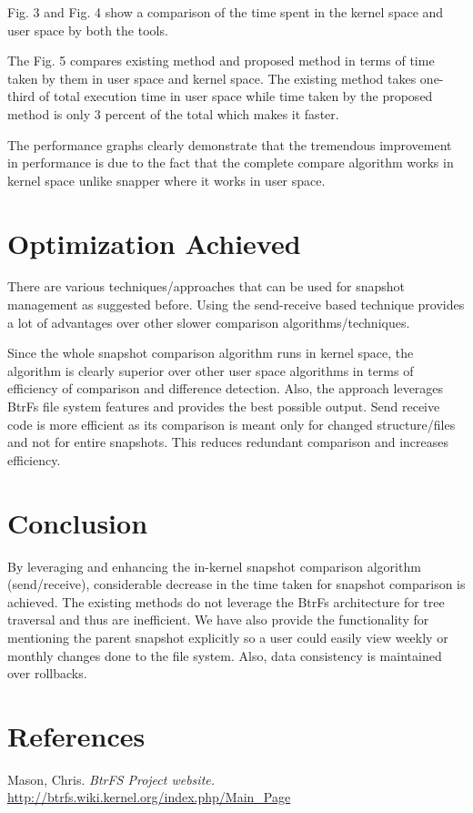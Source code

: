 \documentclass[final]{ols}
\begin{document}
Fig. 3 and Fig. 4 show a comparison of the time spent in the kernel space and user space by both the tools. 

The Fig. 5 compares existing method and proposed method in terms of time taken by them in user space and kernel space.  The existing method takes one-third of total execution time in user space while time taken by the proposed method is only 3 percent of the total which makes it faster. 

The performance graphs clearly demonstrate that the tremendous improvement in performance is due to the fact that the complete compare algorithm works in kernel space unlike snapper where it works in user space.

\section{Optimization Achieved}\label{lockhart-OptimizationAchieved}
There are various techniques/approaches that can be used for snapshot management as suggested before. Using the send-receive based technique provides a lot of advantages over other slower comparison algorithms/techniques.

Since the whole snapshot comparison algorithm runs in kernel space, the algorithm is clearly superior over other user space algorithms in terms of efficiency of comparison and difference detection. Also, the approach leverages BtrFs file system features and provides the best possible output. Send receive code is more efficient as its comparison is meant only for changed structure/files and not for entire snapshots. This reduces redundant comparison and increases efficiency.

\section{Conclusion}\label{lockhart-Conclusion}
By leveraging and enhancing the in-kernel snapshot comparison algorithm (send/receive), considerable decrease in the time taken for snapshot comparison is achieved. The existing methods do not leverage the BtrFs architecture for tree traversal and thus are inefficient. We  have also provide the functionality for mentioning the parent snapshot explicitly so a user could easily view weekly or monthly changes done to the file system. Also, data consistency is maintained over rollbacks.

\section{References}\label{lockhart-References}
Mason, Chris. \textit{BtrFS Project website.} {\small\url{http://btrfs.wiki.kernel.org/index.php/Main\_Page}}
\end{document}
